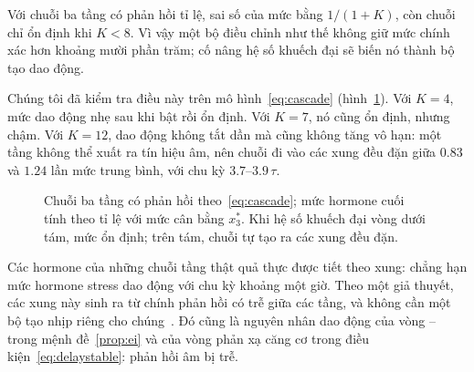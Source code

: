 \begin{keyblock}
\begin{proposition}
\label{prop:cascade}
Với chuỗi ba tầng có phản hồi tỉ lệ, sai số của mức bằng $1/(1+K)$, còn chuỗi chỉ ổn định khi $K<8$. Vì vậy một bộ điều chỉnh như thế không giữ mức chính xác hơn khoảng mười phần trăm; cố nâng hệ số khuếch đại sẽ biến nó thành bộ tạo dao động.
\end{proposition}
\end{keyblock}

Chúng tôi đã kiểm tra điều này trên mô hình~\eqref{eq:cascade} (hình~\ref{fig:cascade}). Với $K=4$, mức dao động nhẹ sau khi bật rồi ổn định. Với $K=7$, nó cũng ổn định, nhưng chậm. Với $K=12$, dao động không tắt dần mà cũng không tăng vô hạn: một tầng không thể xuất ra tín hiệu âm, nên chuỗi đi vào các xung đều đặn giữa $0.83$ và $1.24$ lần mức trung bình, với chu kỳ $3.7$--$3.9\,\tau$.

\begin{figure}[t]
\centering
{}
\caption{Chuỗi ba tầng có phản hồi theo~\eqref{eq:cascade}; mức hormone cuối tính theo tỉ lệ với mức cân bằng $x_3^*$. Khi hệ số khuếch đại vòng dưới tám, mức ổn định; trên tám, chuỗi tự tạo ra các xung đều đặn.}
\label{fig:cascade}
\end{figure}

Các hormone của những chuỗi tầng thật quả thực được tiết theo xung: chẳng hạn mức hormone stress dao động với chu kỳ khoảng một giờ. Theo một giả thuyết, các xung này sinh ra từ chính phản hồi có trễ giữa các tầng, và không cần một bộ tạo nhịp riêng cho chúng~\cite{Walker2010}. Đó cũng là nguyên nhân dao động của vòng -- trong mệnh đề~\ref{prop:ei} và của vòng phản xạ căng cơ trong điều kiện~\eqref{eq:delaystable}: phản hồi âm bị trễ.

